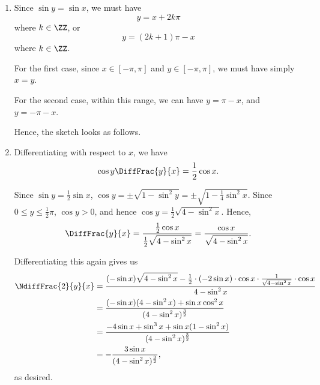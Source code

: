 \Question{\currfilebase}

\begin{enumerate}
    \item Since \(\sin y = \sin x\), we must have
          \[
              y = x + 2 k \pi
          \]
          where \(k \in \ZZ\), or
          \[
              y = (2k + 1) \pi - x
          \]
          where \(k \in \ZZ\).

          For the first case, since \(x \in [-\pi, \pi]\) and \(y \in [-\pi, \pi]\), we must have simply \(x = y\).

          For the second case, within this range, we can have \(y = \pi - x\), and \(y = - \pi - x\).

          Hence, the sketch looks as follows.

          \begin{center}
              
          \end{center}

    \item Differentiating with respect to \(x\), we have
          \[
              \cos y \DiffFrac{y}{x} = \frac{1}{2} \cos x.
          \]

          Since \(\sin y = \frac{1}{2} \sin x\), \(\cos y = \pm \sqrt{1 - \sin^2 y} = \pm \sqrt{1 - \frac{1}{4} \sin^2 x}\). Since \(0 \leq y \leq \frac{1}{2} \pi\), \(\cos y > 0\), and hence \(\cos y = \frac{1}{2} \sqrt{4 - \sin^2 x}\). Hence,
          \[
              \DiffFrac{y}{x} = \frac{\frac{1}{2} \cos x}{\frac{1}{2} \sqrt{4 - \sin^2 x}} = \frac{\cos x}{\sqrt{4 - \sin^2 x}}.
          \]

          Differentiating this again gives us
          \begin{align*}
              \NdiffFrac{2}{y}{x} & = \frac{(- \sin x) \sqrt{4 - \sin^2 x} - \frac{1}{2} \cdot (-2 \sin x) \cdot \cos x \cdot \frac{1}{\sqrt{4 - \sin^2 x}} \cdot \cos x}{4 - \sin^2 x} \\
                                  & = \frac{(- \sin x) (4 - \sin^2 x) + \sin x \cos^2 x}{(4 - \sin^2 x)^{\frac{3}{2}}}                                                                  \\
                                  & = \frac{-4 \sin x + \sin^3 x + \sin x (1 - \sin^2 x)}{(4 - \sin^2 x)^{\frac{3}{2}}}                                                                 \\
                                  & = -\frac{3 \sin x}{(4 - \sin^2 x)^{\frac{3}{2}}},
          \end{align*}
          as desired.


\end{enumerate}
